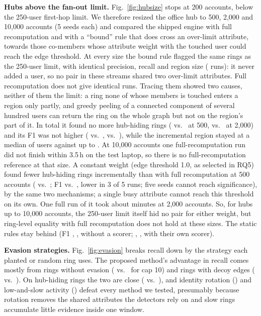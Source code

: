 \textbf{Hubs above the fan-out limit.} Fig.~\ref{fig:hubsize} stops at 200
accounts, below the 250-user first-hop limit. We therefore resized the office
hub to 500, 2,000 and 10,000 accounts (5 seeds each) and compared the shipped
engine with full recomputation and with a ``bound'' rule that does cross an
over-limit attribute, towards those co-members whose attribute weight with the
touched user could reach the edge threshold. At every size the bound rule
flagged the same rings as the 250-user limit, with identical precision, recall
and region size (\LhBoundSame{} runs): it never added a user, so no pair in these
streams shared two over-limit attributes. Full recomputation does not give
identical runs. Tracing them showed two causes, neither of them the limit: a
ring none of whose members is touched enters a region only partly, and greedy
peeling of a connected component of several hundred users can return the ring
on the whole graph but not on the region's part of it. In total it found no
more hub-hiding rings (\LhLogFullHHA{} vs.\
\LhLogFanHHA{} at 500, \LhLogFullHHB{} vs.\ \LhLogFanHHB{} at 2,000) and its F1
was not higher (\LhLogFullFA{} vs.\ \LhLogFanFA{}, \LhLogFullFB{} vs.\
\LhLogFanFB{}), while the incremental region stayed at a median of
\LhRegionInc{} users against up to \LhRegionFullMax{}. At 10,000 accounts one
full-recomputation run did not finish within 3.5\,h on the test laptop, so
there is no full-recomputation reference at that size. A constant weight (edge threshold 1.0, as selected in RQ5) found fewer
hub-hiding rings incrementally than with full recomputation at 500 accounts
(\LhConstFanHHA{} vs.\ \LhConstFullHHA{}; F1 \LhConstFanFA{} vs.\
\LhConstFullFA{}, lower in 3 of 5 runs; five seeds cannot reach significance),
by the same two mechanisms; a single busy attribute cannot reach this threshold
on its own. One full run of it took about \LhConstFullWallB{} minutes at 2,000
accounts. So, for hubs up to 10,000 accounts, the 250-user limit itself hid no
pair for either weight, but ring-level equality with full recomputation does
not hold at these sizes. The static rules stay behind (F1 \LhCapTenFA{},
\LhCapTenFB{}, \LhCapTenFC{} without a scorer; \RfScRulesLhA{},
\RfScRulesLhB{}, \RfScRulesLhC{} with their own scorer).

\textbf{Evasion strategies.} Fig.~\ref{fig:evasion} breaks recall down by the
strategy each planted or random ring uses. The proposed method's advantage in
recall comes mostly from rings without evasion (\EvPropNone{} vs.\
\EvCapTenNone{} for cap 10) and rings with decoy edges (\EvPropDecoyEdges{}
vs.\ \EvCapTenDecoyEdges{}). On hub-hiding rings the two are close
(\EvPropHubHiding{} vs.\ \EvCapTenHubHiding{}), and identity rotation
(\EvPropIdentityRotation{}) and low-and-slow activity (\EvPropLowAndSlow{})
defeat every method we tested, presumably because rotation removes the shared
attributes the detectors rely on and slow rings accumulate little evidence
inside one window.

